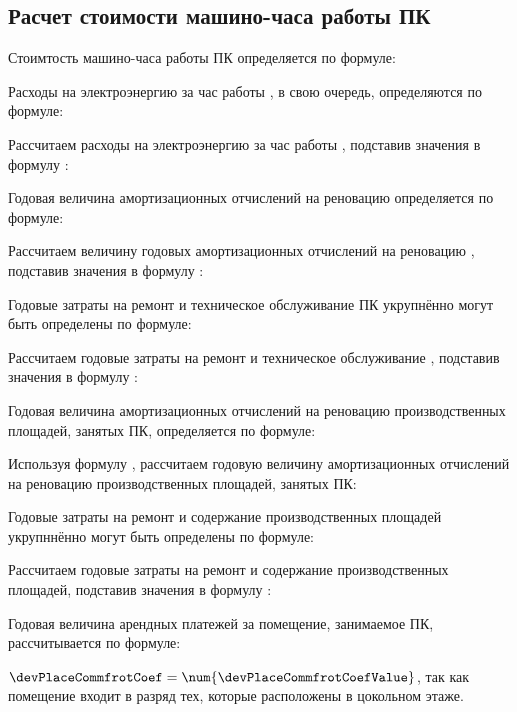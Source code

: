 \subsection{Расчет стоимости машино-часа работы ПК}
\label{sec:economics:cpuclocktime}

Стоимтость машино-часа работы ПК определяется по формуле:
\pcHourCostEquation

Расходы на электроэнергию за час работы \pc, в свою очередь, определяются по формуле:
\energyHourCostEquation

Рассчитаем расходы на электроэнергию за час работы \pc, подставив значения в формулу :
\energyHourCostFormulaApplied

Годовая величина амортизационных отчислений на реновацию \pc определяется по формуле:
\pcAmortizationCostEquation

Рассчитаем величину годовых амортизационных отчислений на реновацию \pc, подставив значения в формулу :
\pcAmortizationCostFormulaApplied

Годовые затраты на ремонт и техническое обслуживание ПК укрупнённо могут быть определены по формуле:
\pcSupportCostEquation

Рассчитаем годовые затраты на ремонт и техническое обслуживание \pc, подставив значения в формулу :
\pcSupportCostFormulaApplied

Годовая величина амортизационных отчислений на реновацию производственных площадей, занятых ПК, определяется по формуле:
\devPlaceAmortizationCostEquation

Используя формулу , рассчитаем годовую величину амортизационных отчислений на реновацию производственных площадей, занятых ПК:
\devPlaceAmortizationCostFormulaApplied

Годовые затраты на ремонт и содержание производственных площадей укрупннённо могут быть определены по формуле:
\devPlaceSupportCostEquation

Рассчитаем годовые затраты на ремонт и содержание производственных площадей, подставив значения в формулу :
\devPlaceSupportCostFormulaApplied

Годовая величина арендных платежей за помещение, занимаемое ПК, рассчитывается по формуле:
\devPlaceRentCostEquation

\(\devPlaceCommfrotCoef = \num{\devPlaceCommfrotCoefValue}\), так как помещение входит в разряд тех, которые расположены в цокольном этаже.

